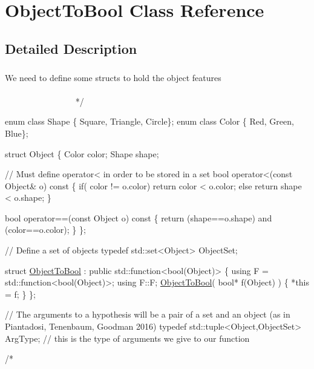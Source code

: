 \hypertarget{class_object_to_bool}{}\section{Object\+To\+Bool Class Reference}
\label{class_object_to_bool}


\subparagraph*{} 




\subsection{Detailed Description}
\subparagraph*{}

\subparagraph*{}


\begin{DoxyCode}
    We need to define some structs to hold the \textcolor{keywordtype}{object} features
   ~~~~~~~~~~~~~~~~~~~~~~~~~~~~~~~~~~~~~~~~~~~~~~~~~~~~~~~~~~~~~~~~~~~~~~~~~~~~~~~~~~~~~~~~ */



\textcolor{keyword}{enum class} Shape \{ Square, Triangle, Circle\};
\textcolor{keyword}{enum class} Color \{ Red, Green, Blue\};

\textcolor{keyword}{struct }Object \{ 
    Color color; 
    Shape shape; 

    \textcolor{comment}{// Must define operator< in order to be stored in a set}
    \textcolor{keywordtype}{bool} operator<(\textcolor{keyword}{const} Object& o)\textcolor{keyword}{ const }\{
        \textcolor{keywordflow}{if}( color != o.color) \textcolor{keywordflow}{return} color < o.color;
        \textcolor{keywordflow}{else}                  \textcolor{keywordflow}{return} shape < o.shape;
    \}

    \textcolor{keywordtype}{bool} operator==(\textcolor{keyword}{const} Object o)\textcolor{keyword}{ const }\{
        \textcolor{keywordflow}{return} (shape==o.shape) and (color==o.color);
    \}
\};


\textcolor{comment}{// Define a set of objects}
\textcolor{keyword}{typedef} std::set<Object> ObjectSet;

\textcolor{keyword}{struct }\hyperlink{class_object_to_bool}{ObjectToBool} : \textcolor{keyword}{public} std::function<bool(Object)> \{
    \textcolor{keyword}{using} F = std::function<bool(Object)>;
    \textcolor{keyword}{using} F::F;
    \hyperlink{class_object_to_bool}{ObjectToBool}( \textcolor{keywordtype}{bool}* f(Object) ) \{
        *\textcolor{keyword}{this} = f;
    \}
\};

\textcolor{comment}{// The arguments to a hypothesis will be a pair of a set and an object (as in Piantadosi, Tenenbaum,
       Goodman 2016)}
\textcolor{keyword}{typedef} std::tuple<Object,ObjectSet> ArgType; \textcolor{comment}{// this is the type of arguments we give to our function}

\textcolor{comment}{/*}
\end{DoxyCode}
